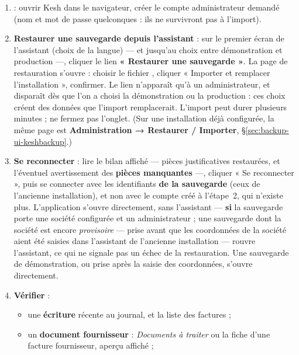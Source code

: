 \documentclass[a4paper,11pt,oneside]{article}
\begin{document}
\begin{enumerate}
\begin{itemize}
    \end{itemize}
    Si un \textbf{proxy inverse} précède Kesh, le régler pour la taille et la durée de l'envoi --- bloc \texttt{location /api/v1/admin/} de \S\ref{sec:reverse-proxy}, taille égale au plafond d'import, délai d'une heure. Prévoir sur le disque environ \textbf{deux fois} la taille du fichier (le fichier reçu, puis les pièces écrites).
    \item \textbf{} : ouvrir Kesh dans le navigateur, créer le compte administrateur demandé (nom et mot de passe quelconques : ils ne survivront pas à l'import).
    \item \textbf{Restaurer une sauvegarde depuis l'assistant} : sur le premier écran de l'assistant (choix de la langue) --- et jusqu'au choix entre démonstration et production ---, cliquer le lien \textbf{« Restaurer une sauvegarde »}. La page de restauration s'ouvre : choisir le fichier , cliquer « Importer et remplacer l'installation », confirmer. Le lien n'apparaît qu'à un administrateur, et disparaît dès que l'on a choisi la démonstration ou la production : ces choix créent des données que l'import remplacerait. L'import peut durer plusieurs minutes ; ne fermez pas l'onglet. (Sur une installation déjà configurée, la même page est \textbf{Administration → Restaurer / Importer}, \S\ref{sec:backup-ui-keshbackup}.)
    \item \textbf{Se reconnecter} : lire le bilan affiché --- pièces justificatives restaurées, et l'éventuel avertissement des \textbf{pièces manquantes} ---, cliquer « Se reconnecter », puis se connecter avec les identifiants \textbf{de la sauvegarde} (ceux de l'ancienne installation), et non avec le compte créé à l'étape~2, qui n'existe plus. L'application s'ouvre directement, sans l'assistant --- \textbf{si} la sauvegarde porte une société configurée et un administrateur ; une sauvegarde dont la société est encore \emph{provisoire} --- prise avant que les coordonnées de la société aient été saisies dans l'assistant de l'ancienne installation --- rouvre l'assistant, ce qui ne signale pas un échec de la restauration. Une sauvegarde de démonstration, ou prise après la saisie des coordonnées, s'ouvre directement.
    \item \textbf{Vérifier} :
    \begin{itemize}
        \item une \textbf{écriture} récente au journal, et la liste des factures ;
        \item un \textbf{document fournisseur} : \emph{Documents à traiter} ou la fiche d'une facture fournisseur, aperçu affiché ;

\end{itemize}
\end{enumerate}
\end{document}
